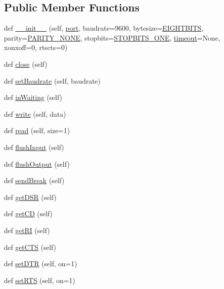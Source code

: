 \subsection*{Public Member Functions}
\begin{DoxyCompactItemize}
\item 
def \hyperlink{classserial_1_1serialjava_1_1_serial_a7c53d8c25f584f940ba777d4ab5c6c81}{\+\_\+\+\_\+init\+\_\+\+\_\+} (self, \hyperlink{z1_2i2c_8c_a9f33b3195a1fecb0b114222456959431}{port}, baudrate=9600, bytesize=\hyperlink{namespaceserial_1_1serialjava_ae5085ada49150183f269e16092b264c2}{E\+I\+G\+H\+T\+B\+I\+TS}, parity=\hyperlink{namespaceserial_1_1serialjava_a6141554964da5eeacffedfa44c84211a}{P\+A\+R\+I\+T\+Y\+\_\+\+N\+O\+NE}, stopbits=\hyperlink{namespaceserial_1_1serialjava_aa2188fd2fd7894097fd536a707f6ab14}{S\+T\+O\+P\+B\+I\+T\+S\+\_\+\+O\+NE}, \hyperlink{classserial_1_1serialjava_1_1_serial_a41c3f66d51a2ea75cb784ed93d23db46}{timeout}=None, xonxoff=0, rtscts=0)
\item 
def \hyperlink{classserial_1_1serialjava_1_1_serial_acaabf8e99fd79f0d97a6604d4bf0eeae}{close} (self)
\item 
def \hyperlink{classserial_1_1serialjava_1_1_serial_adaa1be97d79e35ec53d427ccc7153227}{set\+Baudrate} (self, baudrate)
\item 
def \hyperlink{classserial_1_1serialjava_1_1_serial_a2227d04ad51a496135a9e7463562c674}{in\+Waiting} (self)
\item 
def \hyperlink{classserial_1_1serialjava_1_1_serial_a8e863ebb37343365a2651a64f4e7623e}{write} (self, data)
\item 
def \hyperlink{classserial_1_1serialjava_1_1_serial_a87b7728cc2e52020e7de9fb215ac1148}{read} (self, size=1)
\item 
def \hyperlink{classserial_1_1serialjava_1_1_serial_a40d952ce3575885c3a32e20b5006b079}{flush\+Input} (self)
\item 
def \hyperlink{classserial_1_1serialjava_1_1_serial_a9261c4ee155182ca3a3aa50d2f6247df}{flush\+Output} (self)
\item 
def \hyperlink{classserial_1_1serialjava_1_1_serial_ad200525b7e277cb91eb8eef4c1e3a341}{send\+Break} (self)
\item 
def \hyperlink{classserial_1_1serialjava_1_1_serial_a851757996ef6d6a9afdd19652f9b6aae}{get\+D\+SR} (self)
\item 
def \hyperlink{classserial_1_1serialjava_1_1_serial_a742d03943902e3d287718c62124e040d}{get\+CD} (self)
\item 
def \hyperlink{classserial_1_1serialjava_1_1_serial_abd144cc37b71bf09f52b85b801084e23}{get\+RI} (self)
\item 
def \hyperlink{classserial_1_1serialjava_1_1_serial_a8045e6d0b4704c99412b0d14c4397650}{get\+C\+TS} (self)
\item 
def \hyperlink{classserial_1_1serialjava_1_1_serial_a8687f6a2c64e9019ebef2cd7f2907918}{set\+D\+TR} (self, on=1)
\item 
def \hyperlink{classserial_1_1serialjava_1_1_serial_ad58f98afcf11e52bf8acaac589947f61}{set\+R\+TS} (self, on=1)
\end{DoxyCompactItemize}
